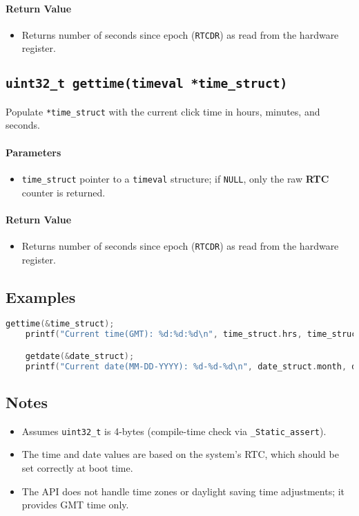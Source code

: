 \paragraph{Return Value}
\begin{itemize}
    \item Returns number of seconds since epoch (\texttt{RTCDR}) as read from the hardware register.
\end{itemize}

\subsection{\texttt{uint32\_t gettime(timeval *time\_struct)}}
Populate \texttt{*time\_struct} with the current click time in hours, minutes, and seconds.

\paragraph{Parameters}
\begin{itemize}
    \item \texttt{time\_struct} pointer to a \texttt{timeval} structure; if \texttt{NULL}, 
    only the raw \textbf{RTC} counter is returned.
\end{itemize}

\paragraph{Return Value}
\begin{itemize}
    \item Returns number of seconds since epoch (\texttt{RTCDR}) as read from the hardware register.
\end{itemize}

\subsection*{Examples}

\begin{lstlisting}[language=C, caption={Examples of getdate and gettime usage in AstraKernel.}, label={lst:datetime_examples}]
    gettime(&time_struct);
    printf("Current time(GMT): %d:%d:%d\n", time_struct.hrs, time_struct.mins, time_struct.secs);

    getdate(&date_struct);
    printf("Current date(MM-DD-YYYY): %d-%d-%d\n", date_struct.month, date_struct.day, date_struct.year);
\end{lstlisting}

\subsection*{Notes}
\begin{itemize}
    \item Assumes \texttt{uint32\_t} is 4-bytes (compile-time check via \texttt{\_Static\_assert}).
    \item The time and date values are based on the system's RTC, which should be set 
    correctly at boot time.
    \item The API does not handle time zones or daylight saving time adjustments; it 
    provides GMT time only.
\end{itemize}